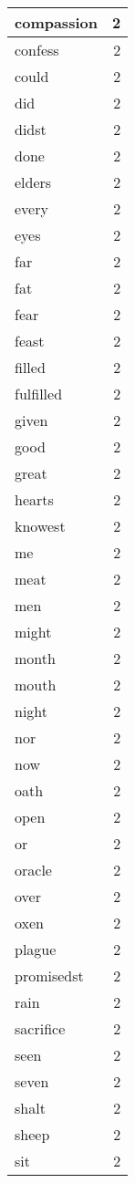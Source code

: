 \begin{center}
\begin{longtable}{l|r}
compassion & 2 \\ \hline
confess & 2 \\ \hline
could & 2 \\ \hline
did & 2 \\ \hline
didst & 2 \\ \hline
done & 2 \\ \hline
elders & 2 \\ \hline
every & 2 \\ \hline
eyes & 2 \\ \hline
far & 2 \\ \hline
fat & 2 \\ \hline
fear & 2 \\ \hline
feast & 2 \\ \hline
filled & 2 \\ \hline
fulfilled & 2 \\ \hline
given & 2 \\ \hline
good & 2 \\ \hline
great & 2 \\ \hline
hearts & 2 \\ \hline
knowest & 2 \\ \hline
me & 2 \\ \hline
meat & 2 \\ \hline
men & 2 \\ \hline
might & 2 \\ \hline
month & 2 \\ \hline
mouth & 2 \\ \hline
night & 2 \\ \hline
nor & 2 \\ \hline
now & 2 \\ \hline
oath & 2 \\ \hline
open & 2 \\ \hline
or & 2 \\ \hline
oracle & 2 \\ \hline
over & 2 \\ \hline
oxen & 2 \\ \hline
plague & 2 \\ \hline
promisedst & 2 \\ \hline
rain & 2 \\ \hline
sacrifice & 2 \\ \hline
seen & 2 \\ \hline
seven & 2 \\ \hline
shalt & 2 \\ \hline
sheep & 2 \\ \hline
sit & 2 \\ \hline

\end{longtable}
\end{center}
